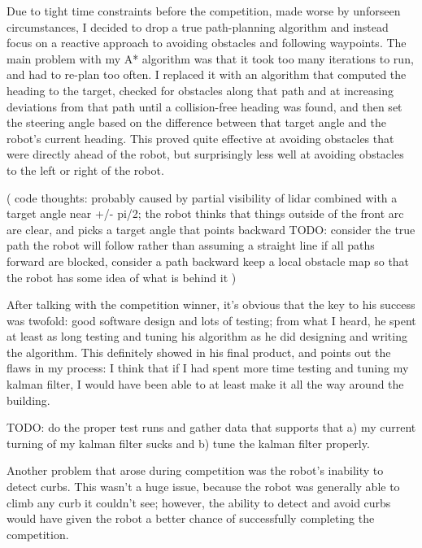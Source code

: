 
Due to tight time constraints before the competition, made worse by unforseen circumstances, I decided to drop a true path-planning algorithm and instead focus on a reactive approach to avoiding obstacles and following waypoints. The main problem with my A* algorithm was that it took too many iterations to run, and had to re-plan too often. I replaced it with an algorithm that computed the heading to the target, checked for obstacles along that path and at increasing deviations from that path until a collision-free heading was found, and then set the steering angle based on the difference between that target angle and the robot's current heading. This proved quite effective at avoiding obstacles that were directly ahead of the robot, but surprisingly less well at avoiding obstacles to the left or right of the robot.

( code thoughts:
  probably caused by partial visibility of lidar combined with a target angle near +/- pi/2; the robot thinks that things outside of the front arc are clear, and picks a target angle that points backward
  TODO:
   consider the true path the robot will follow rather than assuming a straight line
   if all paths forward are blocked, consider a path backward
   keep a local obstacle map so that the robot has some idea of what is behind it
   )

After talking with the competition winner, it's obvious that the key to his success was twofold: good software design and lots of testing; from what I heard, he spent at least as long testing and tuning his algorithm as he did designing and writing the algorithm. This definitely showed in his final product, and points out the flaws in my process: I think that if I had spent more time testing and tuning my kalman filter, I would have been able to at least make it all the way around the building.

TODO: do the proper test runs and gather data that supports that a) my current turning of my kalman filter sucks and b) tune the kalman filter properly.

Another problem that arose during competition was the robot's inability to detect curbs. This wasn't a huge issue, because the robot was generally able to climb any curb it couldn't see; however, the ability to detect and avoid curbs would have given the robot a better chance of successfully completing the competition.
